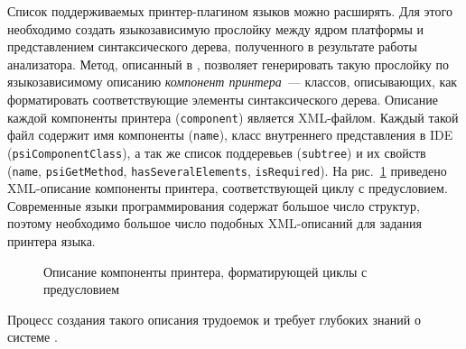 Список поддерживаемых принтер-плагином языков можно расширять.
Для этого необходимо создать языкозависимую прослойку между ядром платформы и представлением синтаксического дерева, полученного в результате работы анализатора.
Метод, описанный в \cite{paper:while}, позволяет генерировать такую прослойку по языкозависимому описанию \emph{компонент принтера}~--- классов, описывающих, как форматировать соответствующие элементы синтаксического дерева.
Описание каждой компоненты принтера (\lstinline{component}) является XML-файлом. Каждый такой файл содержит имя компоненты (\lstinline{name}), класс внутреннего представления в IDE (\lstinline{psiComponentClass}), %
а так же список поддеревьев (\lstinline{subtree}) и их свойств (\lstinline{name}, \lstinline{psiGetMethod}, \lstinline{hasSeveralElements}, \lstinline{isRequired}).
На рис.~\ref{intro:whileComponent} приведено XML-описание компоненты принтера, соответствующей циклу с предусловием.
Современные языки программирования содержат большое число структур, поэтому необходимо большое число подобных XML-описаний для задания принтера языка.
\begin{figure}[h]
    
    \caption{Описание компоненты принтера, форматирующей циклы с предусловием}
    \label{intro:whileComponent}
\end{figure}
\noindent
Процесс создания такого описания трудоемок и требует глубоких знаний о системе \cite{paper:while}.

